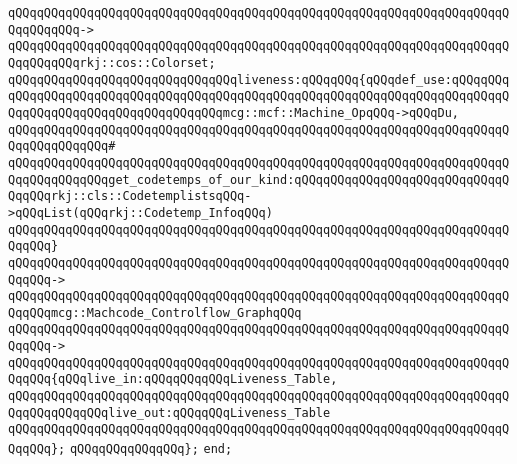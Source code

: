 \verb|qQQqqQQqqQQqqQQqqQQqqQQqqQQqqQQqqQQqqQQqqQQqqQQqqQQqqQQqqQQqqQQqqQQqqQQqqQQqqQQq->|\newline
\verb|qQQqqQQqqQQqqQQqqQQqqQQqqQQqqQQqqQQqqQQqqQQqqQQqqQQqqQQqqQQqqQQqqQQqqQQqqQQqqQQqrkj::cos::Colorset;|\newline
\newline
\verb|qQQqqQQqqQQqqQQqqQQqqQQqqQQqqQQqliveness:qQQqqQQq{qQQqdef_use:qQQqqQQqqQQqqQQqqQQqqQQqqQQqqQQqqQQqqQQqqQQqqQQqqQQqqQQqqQQqqQQqqQQqqQQqqQQqqQQqqQQqqQQqqQQqqQQqqQQqqQQqqQQqmcg::mcf::Machine_OpqQQq->qQQqDu,|\newline
\verb|qQQqqQQqqQQqqQQqqQQqqQQqqQQqqQQqqQQqqQQqqQQqqQQqqQQqqQQqqQQqqQQqqQQqqQQqqQQqqQQqqQQq#|\newline
\verb|qQQqqQQqqQQqqQQqqQQqqQQqqQQqqQQqqQQqqQQqqQQqqQQqqQQqqQQqqQQqqQQqqQQqqQQqqQQqqQQqqQQqget_codetemps_of_our_kind:qQQqqQQqqQQqqQQqqQQqqQQqqQQqqQQqqQQqrkj::cls::CodetemplistsqQQq->qQQqList(qQQqrkj::Codetemp_InfoqQQq)|\newline
\verb|qQQqqQQqqQQqqQQqqQQqqQQqqQQqqQQqqQQqqQQqqQQqqQQqqQQqqQQqqQQqqQQqqQQqqQQqqQQq}|\newline
\verb|qQQqqQQqqQQqqQQqqQQqqQQqqQQqqQQqqQQqqQQqqQQqqQQqqQQqqQQqqQQqqQQqqQQqqQQqqQQq->|\newline
\verb|qQQqqQQqqQQqqQQqqQQqqQQqqQQqqQQqqQQqqQQqqQQqqQQqqQQqqQQqqQQqqQQqqQQqqQQqqQQqmcg::Machcode_Controlflow_GraphqQQq|\newline
\verb|qQQqqQQqqQQqqQQqqQQqqQQqqQQqqQQqqQQqqQQqqQQqqQQqqQQqqQQqqQQqqQQqqQQqqQQqqQQq->|\newline
\verb|qQQqqQQqqQQqqQQqqQQqqQQqqQQqqQQqqQQqqQQqqQQqqQQqqQQqqQQqqQQqqQQqqQQqqQQqqQQq{qQQqlive_in:qQQqqQQqqQQqLiveness_Table,|\newline
\verb|qQQqqQQqqQQqqQQqqQQqqQQqqQQqqQQqqQQqqQQqqQQqqQQqqQQqqQQqqQQqqQQqqQQqqQQqqQQqqQQqqQQqlive_out:qQQqqQQqLiveness_Table|\newline
\verb|qQQqqQQqqQQqqQQqqQQqqQQqqQQqqQQqqQQqqQQqqQQqqQQqqQQqqQQqqQQqqQQqqQQqqQQqqQQq};|\newline
\newline
\verb|qQQqqQQqqQQqqQQq};|\newline
\verb|end;|\newline
\newline

